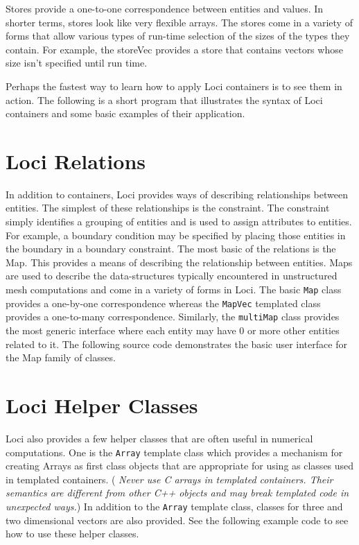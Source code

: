 \documentclass[10pt,epsf]{book}
\begin{document}
Stores provide a one-to-one correspondence between entities and values.
In shorter terms, stores look like very flexible arrays.  The stores
come in a variety of forms that allow various types of run-time selection
of the sizes of the types they contain.  For example, the storeVec
provides a store that contains vectors whose size isn't specified until
run time.

Perhaps the fastest way to learn how to apply Loci containers is to see
them in action.  The following is a short program that illustrates the
syntax of Loci containers and some basic examples of their application.



\section{Loci Relations}
In addition to containers, Loci provides ways of describing
relationships between entities.  The simplest of these relationships
is the constraint.  The constraint simply identifies a grouping of
entities and is used to assign attributes to entities.  For example,
a boundary condition may be specified by placing those entities in the
boundary in a boundary constraint.  The most basic of the relations is
the Map.  This provides a means of describing the relationship between
entities.  Maps are used to describe the data-structures typically
encountered in unstructured mesh computations and come in a variety of
forms in Loci.  The basic {\tt Map} class provides a one-by-one
correspondence whereas the {\tt MapVec} templated class provides a
one-to-many correspondence.  Similarly, the {\tt multiMap} class
provides the most generic interface where each entity may have 0 or
more other entities related to it.  The following source code
demonstrates the basic user interface for the Map family of classes.


%

\section{Loci Helper Classes}

Loci also provides a few helper classes that are often useful in
numerical computations.  One is the {\tt Array} template class which provides a
mechanism for creating Arrays as first class objects that are
appropriate for using as classes used in templated containers. ({\it
Never use C arrays in templated containers.  Their semantics are
different from other C++ objects and may break templated code in
unexpected ways.})  In addition to the {\tt Array} template class,
classes for three and two dimensional vectors are also provided.  See
the following example code to see how to use these helper classes.
\end{document}
